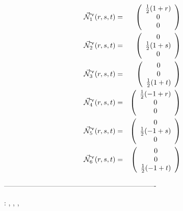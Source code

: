 \begin{mdframed}[backgroundcolor=blue!5]
\begin{eqnarray}
\vec{{\mathcal{N}}}^\upnu_1 (r,s,t) &=& 
\left(\begin{array}{c} \frac12 (1+r) \\ 0 \\ 0\end{array}\right) \nonumber\\
\vec{{\mathcal{N}}}^\upnu_2 (r,s,t) &=& 
\left(\begin{array}{c} 0 \\ \frac12 (1+s) \\0 \end{array}\right) \nonumber\\
\vec{{\mathcal{N}}}^\upnu_3 (r,s,t) &=& 
\left(\begin{array}{c} 0 \\  0 \\\frac12 (1+t)  \end{array}\right) \nonumber\\
\vec{{\mathcal{N}}}^\upnu_4 (r,s,t) &=& 
\left(\begin{array}{c} \frac12 (-1+r) \\ 0 \\ 0 \end{array}\right) \nonumber\\
\vec{{\mathcal{N}}}^\upnu_5 (r,s,t) &=& 
\left(\begin{array}{c} 0 \\ \frac12 (-1+s)  \\ 0 \end{array}\right) \nonumber\\
\vec{{\mathcal{N}}}^\upnu_6 (r,s,t) &=& 
\left(\begin{array}{c} 0 \\ 0 \\\frac12 (-1+t)  \end{array}\right)
\end{eqnarray}
\end{mdframed}



----------------------------------------------------------------


\Literature: ,
 , , 
